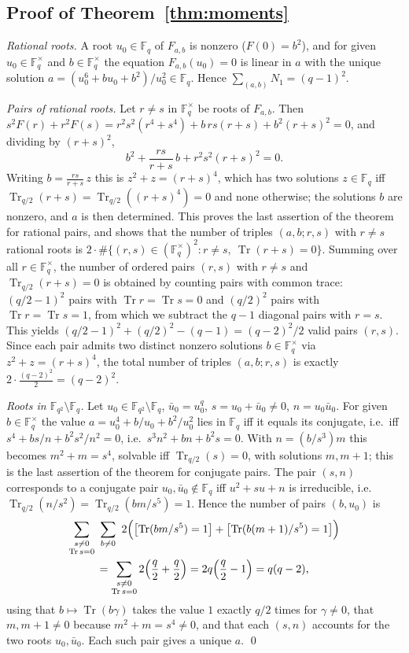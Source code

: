 ﻿\documentclass[12pt,a4paper]{amsart}
\theoremstyle{definition}
\newcommand{\F}{\mathbb{F}}
\newcommand{\Tr}{\operatorname{Tr}}
\begin{document}
\subsection{Proof of Theorem~\ref{thm:moments}}
\emph{Rational roots.} A root $u_0\in\F_q$ of $F_{a,b}$ is nonzero ($F(0)=b^2$), and for given $u_0\in\F_q^\times$ and $b\in\F_q^\times$ the equation $F_{a,b}(u_0)=0$ is linear in $a$ with the unique solution $a=(u_0^6+bu_0+b^2)/u_0^2\in\F_q$. Hence $\sum_{(a,b)}N_1=(q-1)^2$.

\emph{Pairs of rational roots.} Let $r\ne s$ in $\F_q^\times$ be roots of $F_{a,b}$. Then $s^2F(r)+r^2F(s)=r^2s^2(r^4+s^4)+b\,rs(r+s)+b^2(r+s)^2=0$, and dividing by $(r+s)^2$,
\[
b^2+\frac{rs}{r+s}\,b+r^2s^2(r+s)^2=0 .
\]
Writing $b=\frac{rs}{r+s}\,z$ this is $z^2+z=(r+s)^4$, which has two solutions $z\in\F_q$ iff $\Tr_{q/2}(r+s)=\Tr_{q/2}((r+s)^4)=0$ and none otherwise; the solutions $b$ are nonzero, and $a$ is then determined. This proves the last assertion of the theorem for rational pairs, and shows that the number of triples $(a,b;r,s)$ with $r\ne s$ rational roots is $2\cdot\#\{(r,s)\in(\F_q^\times)^2:r\ne s,\ \Tr(r+s)=0\}$. Summing over all $r\in\F_q^\times$, the number of ordered pairs $(r,s)$ with $r\ne s$ and $\Tr_{q/2}(r+s)=0$ is obtained by counting pairs with common trace: $(q/2-1)^2$ pairs with $\Tr r=\Tr s=0$ and $(q/2)^2$ pairs with $\Tr r=\Tr s=1$, from which we subtract the $q-1$ diagonal pairs with $r=s$. This yields $(q/2-1)^2+(q/2)^2-(q-1)=(q-2)^2/2$ valid pairs $(r,s)$. Since each pair admits two distinct nonzero solutions $b\in\F_q^\times$ via $z^2+z=(r+s)^4$, the total number of triples $(a,b;r,s)$ is exactly $2\cdot\frac{(q-2)^2}2=(q-2)^2$.

\emph{Roots in $\F_{q^2}\setminus\F_q$.} Let $u_0\in\F_{q^2}\setminus\F_q$, $\bar u_0=u_0^q$, $s=u_0+\bar u_0\ne0$, $n=u_0\bar u_0$. For given $b\in\F_q^\times$ the value $a=u_0^4+b/u_0+b^2/u_0^2$ lies in $\F_q$ iff it equals its conjugate, i.e.\ iff $s^4+bs/n+b^2s^2/n^2=0$, i.e.\ $s^3n^2+bn+b^2s=0$. With $n=(b/s^3)m$ this becomes $m^2+m=s^4$, solvable iff $\Tr_{q/2}(s)=0$, with solutions $m,m+1$; this is the last assertion of the theorem for conjugate pairs. The pair $(s,n)$ corresponds to a conjugate pair $u_0,\bar u_0\notin\F_q$ iff $u^2+su+n$ is irreducible, i.e.\ $\Tr_{q/2}(n/s^2)=\Tr_{q/2}(bm/s^5)=1$. Hence the number of pairs $(b,u_0)$ is
\begin{multline*}
\sum_{\substack{s\ne0\\ \Tr s=0}}\ \sum_{b\ne0}\ 2\Bigl(\bigl[\Tr(bm/s^5)=1\bigr]+\bigl[\Tr(b(m+1)/s^5)=1\bigr]\Bigr)\\
=\sum_{\substack{s\ne0\\ \Tr s=0}}2\Bigl(\frac q2+\frac q2\Bigr)=2q\Bigl(\frac q2-1\Bigr)=q(q-2),
\end{multline*}
using that $b\mapsto\Tr(b\gamma)$ takes the value $1$ exactly $q/2$ times for $\gamma\ne0$, that $m,m+1\ne0$ because $m^2+m=s^4\ne0$, and that each $(s,n)$ accounts for the two roots $u_0,\bar u_0$. Each such pair gives a unique $a$. \qed
\end{document}

